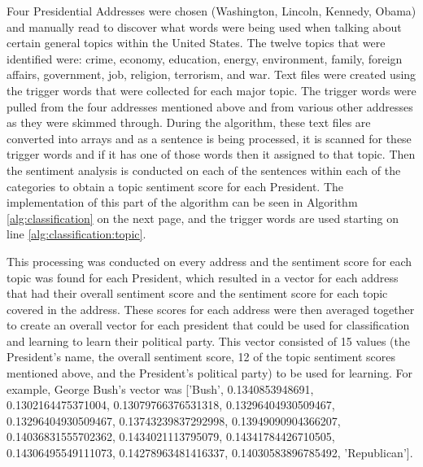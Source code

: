 Four Presidential Addresses were chosen (Washington, Lincoln, Kennedy, Obama) and manually read to discover what words were being used when talking about certain general topics within the United States.
The twelve topics that were identified were: crime, economy, education, energy, environment, family, foreign affairs, government, job, religion, terrorism, and war.
Text files were created using the trigger words that were collected for each major topic.
The trigger words were pulled from the four addresses mentioned above and from various other addresses as they were skimmed through.
During the algorithm, these text files are converted into arrays and as a sentence is being processed, it is scanned for these trigger words and if it has one of those words then it assigned to that topic.
Then the sentiment analysis is conducted on each of the sentences within each of the categories to obtain a topic sentiment score for each President.
The implementation of this part of the algorithm can be seen in Algorithm \ref{alg:classification} on the next page, and the trigger words are used starting on line \ref{alg:classification:topic}.

This processing was conducted on every address and the sentiment score for each topic was found for each President, which resulted in a vector for each address that had their overall sentiment score and the sentiment score for each topic covered in the address.
These scores for each address were then averaged together to create an overall vector for each president that could be used for classification and learning to learn their political party.
This vector consisted of 15 values (the President's name, the overall sentiment score, 12 of the topic sentiment scores mentioned above, and the President's political party) to be used for learning.
For example, George Bush's vector was ['Bush', 0.1340853948691, 0.1302164475371004, 0.13079766376531318, 0.13296404930509467, 0.13296404930509467, 0.13743239837292998, 0.13949090904366207, 0.14036831555702362, 0.1434021113795079, 0.14341784426710505, 0.14306495549111073, 0.14278963481416337, 0.14030583896785492, 'Republican'].

